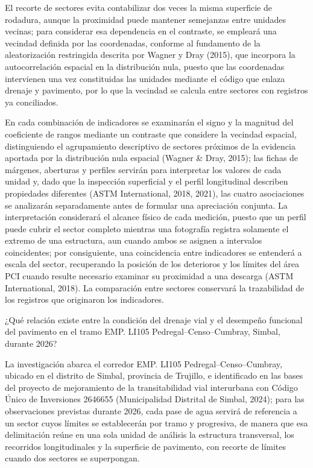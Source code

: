 El recorte de sectores evita contabilizar dos veces la misma superficie de rodadura, aunque la proximidad puede mantener semejanzas entre unidades vecinas; para considerar esa dependencia en el contraste, se empleará una vecindad definida por las coordenadas, conforme al fundamento de la aleatorización restringida descrita por Wagner y Dray (2015), que incorpora la autocorrelación espacial en la distribución nula, puesto que las coordenadas intervienen una vez constituidas las unidades mediante el código que enlaza drenaje y pavimento, por lo que la vecindad se calcula entre sectores con registros ya conciliados.

En cada combinación de indicadores se examinarán el signo y la magnitud del coeficiente de rangos mediante un contraste que considere la vecindad espacial, distinguiendo el agrupamiento descriptivo de sectores próximos de la evidencia aportada por la distribución nula espacial (Wagner \& Dray, 2015); las fichas de márgenes, aberturas y perfiles servirán para interpretar los valores de cada unidad y, dado que la inspección superficial y el perfil longitudinal describen propiedades diferentes (ASTM International, 2018, 2021), las cuatro asociaciones se analizarán separadamente antes de formular una apreciación conjunta. La interpretación considerará el alcance físico de cada medición, puesto que un perfil puede cubrir el sector completo mientras una fotografía registra solamente el extremo de una estructura, aun cuando ambos se asignen a intervalos coincidentes; por consiguiente, una coincidencia entre indicadores se entenderá a escala del sector, recuperando la posición de los deterioros y los límites del área PCI cuando resulte necesario examinar su proximidad a una descarga (ASTM International, 2018). La comparación entre sectores conservará la trazabilidad de los registros que originaron los indicadores.


¿Qué relación existe entre la condición del drenaje vial y el desempeño funcional del pavimento en el tramo EMP. LI105 Pedregal–Censo–Cumbray, Simbal, durante 2026?


La investigación abarca el corredor EMP. LI105 Pedregal–Censo–Cumbray, ubicado en el distrito de Simbal, provincia de Trujillo, e identificado en las bases del proyecto de mejoramiento de la transitabilidad vial interurbana con Código Único de Inversiones 2646655 (Municipalidad Distrital de Simbal, 2024); para las observaciones previstas durante 2026, cada pase de agua servirá de referencia a un sector cuyos límites se establecerán por tramo y progresiva, de manera que esa delimitación reúne en una sola unidad de análisis la estructura transversal, los recorridos longitudinales y la superficie de pavimento, con recorte de límites cuando dos sectores se superpongan.

